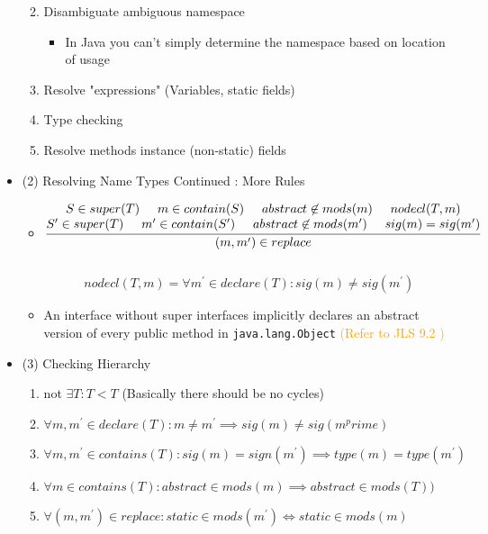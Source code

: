 \documentclass{article}
\begin{document}
\begin{itemize}
\begin{enumerate}
\color{red}
\item Disambiguate ambiguous namespace 
\begin{itemize}
\item In Java you can't simply determine the namespace based on location of usage
\end{itemize} 
\item Resolve "expressions" (Variables, static fields)
\item Type checking
\item Resolve methods instance (non-static) fields
\end{enumerate}
\item (2) Resolving Name Types Continued : More Rules
\begin{itemize}
\item $$
\frac{\begin{matrix}
S \in super(T) \hspace{0.5cm} m \in contain(S) \hspace{0.5cm}  abstract \not\in mods(m) \hspace{0.5cm} nodecl(T, m)  \\
S^\prime \in super(T) \hspace{0.5cm} m^\prime \in contain(S^\prime) \hspace{0.5cm}  abstract \not\in mods(m^\prime ) \hspace{0.5cm} sig(m) = sig(m^\prime) 
\end{matrix}}{(m, m^\prime) \in replace}
$$\\
$$nodecl(T, m) = \forall m^\prime  \in declare(T) : sig(m) \neq sig(m^\prime)$$
\item An interface without super interfaces implicitly declares an abstract version of every public method in \verb|java.lang.Object|  \textcolor{orange}{(Refer to JLS 9.2 )}
\end{itemize}
\item (3) Checking Hierarchy 
\begin{enumerate}
\item not \(\exists T : T < T\) (Basically there should be no cycles)
\item \(\forall m,  m^\prime \in declare(T) : m \neq m^\prime  \implies sig(m) \neq sig(m^prime)\)
\item  \(\forall m, m^\prime \in contains(T): sig(m) = sign(m^\prime) \implies type(m) = type(m^\prime)\)
\item  \(\forall m \in contains(T): abstract \in mods(m) \implies abstract \in mods(T))\)
\item \(\forall(m, m^\prime) \in replace: static \in mods(m^\prime) \iff  static \in mods(m)\)

\end{enumerate}
\end{itemize}
\end{document}
